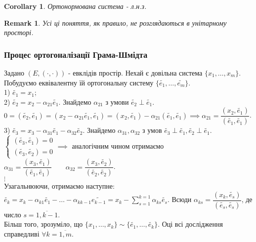 \documentclass[a4paper, 10pt]{article}
\theoremstyle{theoremdd}
\newtheorem{remark}[theorem]{Remark}
\newtheorem{corollary}[theorem]{Corollary}
\begin{document}
\begin{corollary}
Ортонормована система - л.н.з.
\end{corollary}

\begin{remark}
Усі ці поняття, як правило, не розглядаються в унітарному просторі.
\end{remark}

\subsubsection*{Процес ортогоналізації Грама-Шмідта}
Задано $(E,(\cdot,\cdot))$ - евклідів простір. Нехай є довільна система $\{x_1,\dots,x_m\}$. Побудуємо еквівалентну їй ортогональну систему $\{\widetilde{e_1},\dots, \widetilde{e_m} \}$.\\
1) $\widetilde{e_1}=x_1$;\\
2) $\widetilde{e_2} = x_2 - \alpha_{21} \widetilde{e_1}$. Знайдемо $\alpha_{21}$ з умови $\widetilde{e_2} \perp \widetilde{e_1}$.\\
$0 = (\widetilde{e_2}, \widetilde{e_1}) = (x_2-\alpha_{21}\widetilde{e_1}, \tilde{e_1}) = (x_2, \widetilde{e_1})-\alpha_{21} (\widetilde{e_1},\widetilde{e_1}) \implies \alpha_{21} = \dfrac{(x_2,\widetilde{e_1})}{(\widetilde{e_1},\widetilde{e_1})}$.\\
3) $\widetilde{e_3} = x_3 - \alpha_{31} \widetilde{e_1} - \alpha_{32} \widetilde{e_2}$. Знайдемо $\alpha_{31}, \alpha_{32}$ з умов $\widetilde{e_3} \perp \widetilde{e_1}, \widetilde{e_2} \perp \widetilde{e_1}$.\\
$\begin{cases}
(\widetilde{e_3}, \widetilde{e_1}) = 0 \\
(\widetilde{e_3}, \widetilde{e_2}) = 0
\end{cases}
\implies$
аналогічним чином отримаємо $\alpha_{31} = \dfrac{(x_3, \tilde{e_1})}{(\widetilde{e_1},\widetilde{e_1})} \qquad \alpha_{32} = \dfrac{(x_3, \widetilde{e_2})}{(\widetilde{e_2},\widetilde{e_2})}$.\\
$\vdots$\\
Узагальнюючи, отримаємо наступне:\\
$\widetilde{e_k} = x_k - \alpha_{k1} \widetilde{e_1} - \dots - \alpha_{k k-1} \widetilde{e_{k-1}} = x_k - \displaystyle\sum_{s=1}^{k=1} \alpha_{ks} \widetilde{e_s}$. Всюди $\alpha_{ks} = \dfrac{(x_k, \widetilde{e_s})}{(\widetilde{e_s},\widetilde{e_s})}$, де число $s = \overline{1,k-1}$. \\
Більш того, зрозуміло, що $\{x_1,\dots,x_k\} \sim \{\widetilde{e_1},\dots, \widetilde{e_k}\}$. Оці всі дослідження справедливі $\forall k = \overline{1,m}$.
\end{document}
